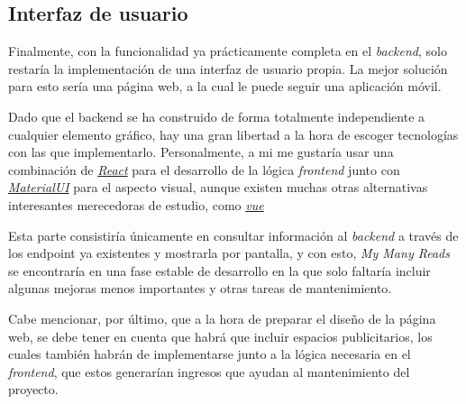 \subsection{Interfaz de usuario}

Finalmente, con la funcionalidad ya prácticamente completa en el \textit{backend}, solo restaría la implementación de una interfaz de usuario propia. La mejor solución para esto sería una página web, a la cual le puede seguir una aplicación móvil.

Dado que el backend se ha construido de forma totalmente independiente a cualquier elemento gráfico, hay una gran libertad a la hora de escoger tecnologías con las que implementarlo. Personalmente, a mi me gustaría usar una combinación de \href{https://es.react.dev/}{\textit{React}} para el desarrollo de la lógica \textit{frontend} junto con \href{https://mui.com/}{\textit{MaterialUI}} para el aspecto visual, aunque existen muchas otras alternativas interesantes merecedoras de estudio, como \href{https://vuejs.org/}{\textit{vue}}

Esta parte consistiría únicamente en consultar información al \textit{backend} a través de los endpoint ya existentes y mostrarla por pantalla, y con esto, \textit{My Many Reads} se encontraría en una fase estable de desarrollo en la que solo faltaría incluir algunas mejoras menos importantes y otras tareas de mantenimiento.

Cabe mencionar, por último, que a la hora de preparar el diseño de la página web, se debe tener en cuenta que habrá que incluir espacios publicitarios, los cuales también habrán de implementarse junto a la lógica necesaria en el \textit{frontend}, que estos generarían ingresos que ayudan al mantenimiento del proyecto.